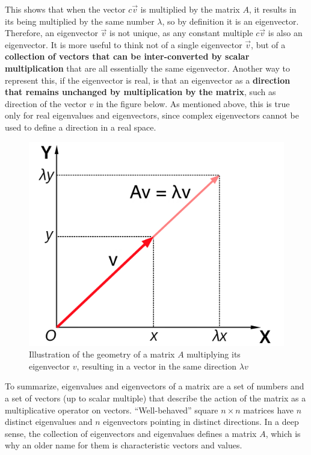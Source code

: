 \documentclass[
  letterpaper,
  DIV=11,
  numbers=noendperiod]{scrreprt}
\begin{document}
This shows that when the vector \(c \vec v\) is multiplied by the matrix
\(A\), it results in its being multiplied by the same number
\(\lambda\), so by definition it is an eigenvector. Therefore, an
eigenvector \(\vec v\) is not unique, as any constant multiple
\(c \vec v\) is also an eigenvector. It is more useful to think not of a
single eigenvector \(\vec v\), but of a \textbf{collection of vectors
that can be inter-converted by scalar multiplication} that are all
essentially the same eigenvector. Another way to represent this, if the
eigenvector is real, is that an eigenvector as a \textbf{direction that
remains unchanged by multiplication by the matrix}, such as direction of
the vector \(v\) in the figure below. As mentioned above, this is true
only for real eigenvalues and eigenvectors, since complex eigenvectors
cannot be used to define a direction in a real space.

\begin{figure}

{\centering \includegraphics{./images/Eigenvalue_equation.png}

}

\caption{Illustration of the geometry of a matrix \(A\) multiplying its
eigenvector \(v\), resulting in a vector in the same direction
\(\lambda v\)}

\end{figure}

To summarize, eigenvalues and eigenvectors of a matrix are a set of
numbers and a set of vectors (up to scalar multiple) that describe the
action of the matrix as a multiplicative operator on vectors.
``Well-behaved'' square \(n \times n\) matrices have \(n\) distinct
eigenvalues and \(n\) eigenvectors pointing in distinct directions. In a
deep sense, the collection of eigenvectors and eigenvalues defines a
matrix \(A\), which is why an older name for them is characteristic
vectors and values.
\end{document}
